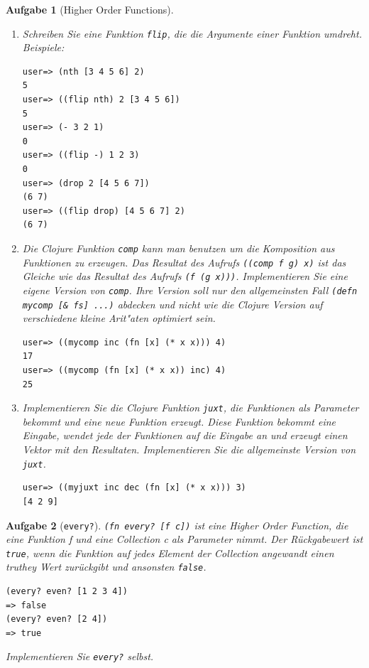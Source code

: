 \documentclass[11pt,a4paper]{article}
\newcounter{numb}
\theoremstyle{break}
\newtheorem{aufgabe}{Aufgabe}[numb]
\begin{document}
\begin{aufgabe}[Higher Order Functions]
\begin{enumerate}[label=\alph*)]

 \item Schreiben Sie eine Funktion \texttt{flip}, die die Argumente einer Funktion umdreht.
 Beispiele:
 \begin{verbatim}
user=> (nth [3 4 5 6] 2)
5
user=> ((flip nth) 2 [3 4 5 6])
5
user=> (- 3 2 1)
0
user=> ((flip -) 1 2 3)
0
user=> (drop 2 [4 5 6 7])
(6 7)
user=> ((flip drop) [4 5 6 7] 2)
(6 7) \end{verbatim}
\item Die Clojure Funktion \texttt{comp} kann man benutzen um die Komposition aus Funktionen zu erzeugen. Das Resultat des Aufrufs \texttt{((comp f g) x)} ist das Gleiche wie das Resultat des Aufrufs \texttt{(f (g x)))}. Implementieren Sie eine eigene Version von \texttt{comp}. Ihre Version soll nur den allgemeinsten Fall \texttt{(defn mycomp [\& fs] ...)} abdecken und nicht wie die Clojure Version auf verschiedene kleine Arit"aten optimiert sein.  

\begin{verbatim}
user=> ((mycomp inc (fn [x] (* x x))) 4)
17
user=> ((mycomp (fn [x] (* x x)) inc) 4)
25 \end{verbatim}



\item Implementieren Sie die Clojure Funktion \texttt{juxt}, die Funktionen als Parameter bekommt und eine neue Funktion erzeugt. Diese Funktion bekommt eine Eingabe, wendet jede der Funktionen auf die Eingabe an und erzeugt einen Vektor mit den Resultaten. Implementieren Sie die allgemeinste Version von \texttt{juxt}.

\begin{verbatim}
user=> ((myjuxt inc dec (fn [x] (* x x))) 3)
[4 2 9] \end{verbatim}

\end{enumerate}
\end{aufgabe}



\begin{aufgabe}[\texttt{every?}]
    \texttt{(fn every? [f c])} ist eine Higher Order Function, die eine Funktion f und eine Collection c als Parameter nimmt.
    Der R\"uckgabewert ist \texttt{true}, wenn die Funktion auf jedes Element der Collection angewandt einen truthey Wert zur\"uckgibt und ansonsten \texttt{false}.

    \begin{verbatim}
(every? even? [1 2 3 4]) 
=> false
(every? even? [2 4])
=> true \end{verbatim}

    Implementieren Sie \texttt{every?} selbst.
\end{aufgabe}
\end{document}
